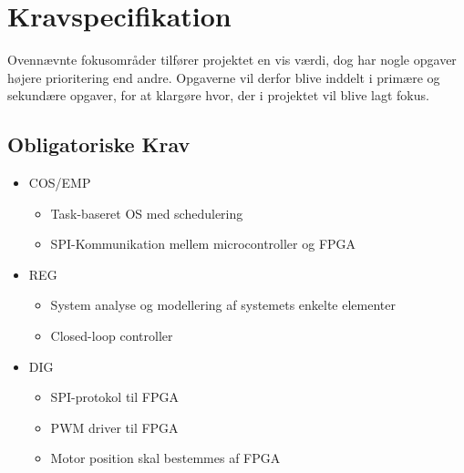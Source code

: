 \section{Kravspecifikation}

Ovennævnte fokusområder tilfører projektet en vis værdi, dog har nogle opgaver højere prioritering end andre. Opgaverne vil derfor blive inddelt i primære og sekundære opgaver, for at klargøre hvor, der i projektet vil blive lagt fokus.

\subsection{Obligatoriske Krav}

\begin{itemize}[noitemsep]
	\item COS/EMP
	\begin{itemize}[noitemsep]
		\item Task-baseret OS med schedulering
		\item SPI-Kommunikation mellem microcontroller og FPGA
	\end{itemize}
	\item REG
	\begin{itemize}[noitemsep]
		\item System analyse og modellering af systemets enkelte elementer
		\item Closed-loop controller
	\end{itemize}
	\item DIG
	\begin{itemize}[noitemsep]
		\item SPI-protokol til FPGA
		\item PWM driver til FPGA
		\item Motor position skal bestemmes af FPGA
	\end{itemize}
\end{itemize}

